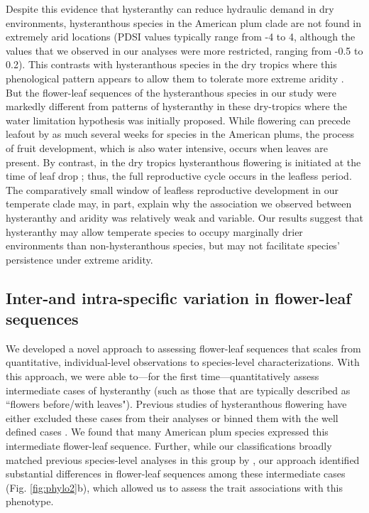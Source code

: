 \documentclass{article}[12pt]
\begin{document}
{Despite this evidence that hysteranthy can reduce hydraulic demand in dry environments, hysteranthous species in the American plum clade are not found in extremely arid locations (PDSI values typically range from -4 to 4, although the values that we observed in our analyses were more restricted, ranging from -0.5 to 0.2). This contrasts with hysteranthous species in the dry tropics where this phenological pattern appears to allow them to tolerate more extreme aridity \citep{Franklin2016}. But the flower-leaf sequences of the hysteranthous species in our study were markedly different from patterns of hysteranthy in these dry-tropics where the water limitation hypothesis was initially proposed. While flowering can precede leafout by as much several weeks for species in the American plums, the process of fruit development, which is also water intensive, occurs when leaves are present. By contrast, in the dry tropics hysteranthous flowering is initiated at the time of leaf drop \citep{Borchert1983,Franklin2016}; thus, the full reproductive cycle occurs in the leafless period. The comparatively small window of leafless reproductive development in our temperate clade may, in part, explain why the association we observed between hysteranthy and aridity was relatively weak and variable. Our results suggest that hysteranthy may allow temperate species to occupy marginally drier environments than non-hysteranthous species, but may not facilitate species' persistence under extreme aridity. 

\subsection*{Inter-and intra-specific variation in flower-leaf sequences} %
We developed a novel approach to assessing flower-leaf sequences that scales from quantitative, individual-level observations to species-level characterizations. With this approach, we were able to---for the first time---quantitatively assess intermediate cases of hysteranthy (such as those that are typically described as ``flowers before/with leaves"). Previous studies of hysteranthous flowering have either excluded these cases from their analyses  \citep[e.g.;][]{Gougherty2018} or binned them with the well defined cases \citep[e.g.;][]{Buonaiuto2020}. We found that many American plum species expressed this intermediate flower-leaf sequence. Further, while our classifications broadly matched previous species-level analyses in this group by \citet{Shaw:2004aa}, our approach identified substantial differences in flower-leaf sequences among these intermediate cases (Fig. \ref{fig:phylo2}b), which allowed us to assess the trait associations with this phenotype.
% 

}
\end{document}
